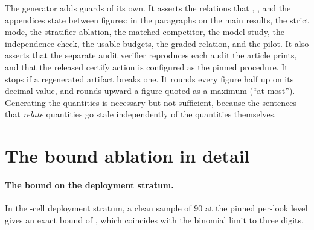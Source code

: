 The generator adds guards of its own. It asserts the relations that
, , and the appendices state
between figures: in the paragraphs on the main results, the strict
mode, the stratifier ablation, the matched competitor, the model study,
the independence check, the usable budgets, the graded relation, and
the pilot. It also asserts that the separate audit verifier reproduces
each audit the article prints, and that the released certify action is
configured as the pinned procedure. It stops if a regenerated artifact
breaks one. It rounds every figure half up on its decimal value, and
rounds upward a figure quoted as a maximum (``at most'').
Generating the quantities is necessary but not sufficient, because the
sentences that \emph{relate} quantities go stale independently of the
quantities themselves.

\FloatBarrier
\keepheading
\section{The bound ablation in detail}
\label{app:grid}
\keeprunin
\paragraph{The bound on the deployment stratum.} In the
\deployFalseStratum-cell deployment stratum, a clean sample of $90$ at
the pinned per-look level gives an exact bound of \boundExactAtNLarge,
which coincides with the binomial limit to three digits.

\begin{table}[t]
\caption{Five upper confidence bounds inside the same pinned procedure
on the same stored labels. The first two columns give each bound on a
clean sample of $90$ draws and on the deployment evidence of
\deployMpFlipsLoose\ flips in \deployMpLookLoose\ draws. The four
fixed-sample bounds are read at the pinned per-look level, $\delta/12$,
and the betting sequence at the unsplit per-stratum level, $\delta/2$
(Appendix~\ref{app:grid} states the caveat on its validity). The next three columns give the certifying
configurations, mean savings, and oracle calls over the
Table~\ref{tab:main} grid (main seed). The last gives the worst rate of
unsafe certificates, the event of Theorem~\ref{thm:valid}, at planted
nulls in the calibration replay (per-stratum $\delta{=}0.05$). WoR:
without replacement.}
\label{tab:bounds}
\centering\small

\end{table}
\keeprunin
